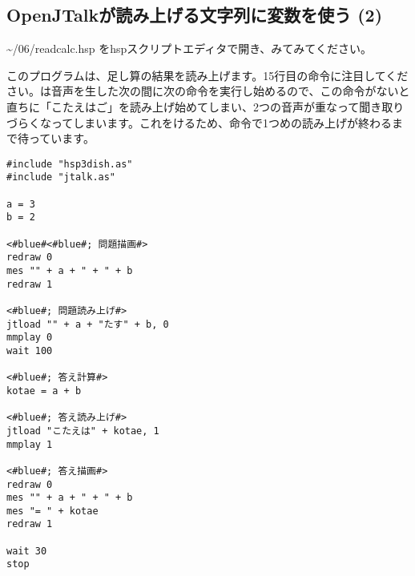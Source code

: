 \subsection{OpenJTalkが読み上げる文字列に変数を使う (2)}
 \textasciitilde /06/readcalc.hsp をhspスクリプトエディタで開き、みてみてください。

このプログラムは、足し算の結果を読み上げます。15行目の命令に注目してください。は音声を生した次の間に次の命令を実行し始めるので、この命令がないと直ちに「こたえはご」を読み上げ始めてしまい、2つの音声が重なって聞き取りづらくなってしまいます。これをけるため、命令で1つめの読み上げが終わるまで待っています。\\

\begin{lstlisting}[caption=readcalc.hsp,label=readcalc.hsp]
#include "hsp3dish.as"
#include "jtalk.as"

a = 3
b = 2

<#blue#<#blue#; 問題描画#>
redraw 0
mes "" + a + " + " + b
redraw 1

<#blue#; 問題読み上げ#>
jtload "" + a + "たす" + b, 0
mmplay 0
wait 100

<#blue#; 答え計算#>
kotae = a + b

<#blue#; 答え読み上げ#>
jtload "こたえは" + kotae, 1
mmplay 1

<#blue#; 答え描画#>
redraw 0
mes "" + a + " + " + b
mes "= " + kotae
redraw 1

wait 30
stop
\end{lstlisting}

\begin{tcolorbox}[title=\useOmetoi]
\begin{enumerate}
\end{enumerate}
\end{tcolorbox}
